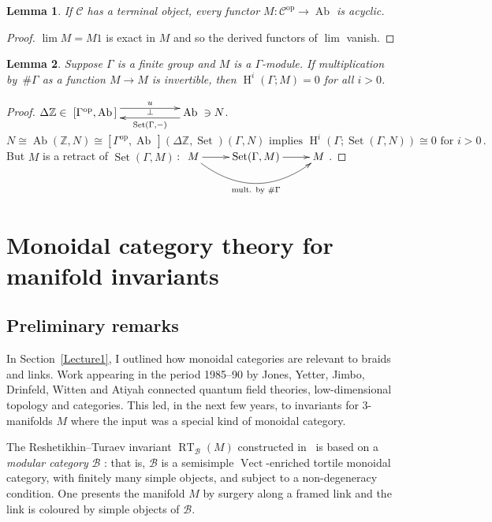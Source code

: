 \documentclass[a4paper,12pt]{article}
\newtheorem*{Lemma}{Lemma}%
\theoremstyle{definition}
\theoremstyle{fact}
\theoremstyle{genquest}
\theoremstyle{step}
\newcommand{\Ab}{\operatorname{Ab}}
\newcommand{\catB}{\mathcal{B}}
\newcommand{\catC}{\mathcal{C}}
\newcommand{\coHom}{\operatorname{H}}
\newcommand{\RT}{\operatorname{RT}}
\newcommand{\Set}{\operatorname{Set}}
\newcommand{\Vect}{\operatorname{Vect}}
\newcommand{\ZZ}{\mathbb{Z}}
\newcommand{\op}{\operatorname{op}}
\newcommand{\longto}{\longrightarrow}
\begin{document}
\begin{Lemma}
If $\catC$ has a terminal object, every functor $M : \catC^{\op}  \longto\Ab  $ is acyclic.
\end{Lemma}

\begin{proof}
$\lim M = M1$ is exact in $M$ and so the derived functors of $\lim$ vanish. 
\end{proof}

\begin{Lemma}
Suppose  $\Gamma$  is a finite group and $M$ is a $\Gamma$-module. 
If multiplication by~$\# \Gamma$ as a function $M \to M$ is invertible, then $\coHom^i (\Gamma;M)=0$ for all $i >0$.
\end{Lemma}
 
\begin{proof}
$\Delta\ZZ  \in \xymatrix{
 [\Gamma^{\op},\Ab\,] \ar@<1ex>[rr]^-{u} &&\Ab   \ar@<1ex>[ll]_-{\perp}^-{\Set (\Gamma,-)} 
} \ni N$.
\[
 N \cong \Ab(\ZZ ,N) \cong [\Gamma^{\op},\Ab \,] (\Delta \ZZ , \Set ) (\Gamma,N) %
 \text{ implies } \coHom^i (\Gamma; \Set (\Gamma,N)) \cong 0 \text{ for } i>0\,.
 \]  
But $M$ is a retract of $\Set (\Gamma,M)\,$:
$
 \xymatrix{
  M  \ar[r]    \ar@/_2pc/[rr]_{\text{mult. by $\# \Gamma$}} &\Set  (\Gamma,M) \ar[r] & M %
   } %
$. 
\end{proof}


\section{Monoidal category theory for manifold invariants\label{Lecture4}}

\subsection{Preliminary remarks}

In Section~\ref{Lecture1}, I outlined how monoidal categories are relevant to braids and links.  
Work appearing in the period 1985--90 by Jones, Yetter, Jimbo, Drinfeld, Witten and Atiyah 
connected quantum field theories, low-dimensional topology and categories. 
%
This led, in the next few years, to invariants for 3-manifolds $M$ where the input was a special kind of monoidal category.
 
The Reshetikhin--Turaev invariant $\RT_\catB (M)$ constructed in~\cite{ReshTur1991} is based on a \emph{modular category} $\catB$ : that is, $\catB$ is a semisimple $\Vect $-enriched tortile monoidal category, with finitely many simple objects, and subject to a non-degeneracy condition.  One presents the manifold $M$ by surgery along a framed link and the link is coloured by simple objects of $\catB$.  
\end{document}
